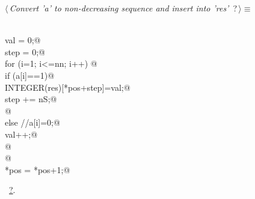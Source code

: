 \documentclass[reqno]{amsart}
\renewcommand{\NWtarget}[2]{\hypertarget{#1}{#2}}
\renewcommand{\NWlink}[2]{\hyperlink{#1}{#2}}
\begin{document}
\begin{flushleft} \small
\begin{minipage}{\linewidth}\label{scrap13}\raggedright\small
\NWtarget{nuweb?}{} $\langle\,${\itshape Convert 'a' to non-decreasing sequence and insert into 'res'}\nobreak\ {\footnotesize {?}}$\,\rangle\equiv$
\vspace{-1ex}
\begin{list}{}{} \item
\mbox{}\verb@@\\
\mbox{}\verb@                val = 0;@\\
\mbox{}\verb@                step = 0;@\\
\mbox{}\verb@                for (i=1; i<=nn; i++) {@\\
\mbox{}\verb@                        if (a[i]==1){@\\
\mbox{}\verb@                                INTEGER(res)[*pos+step]=val;@\\
\mbox{}\verb@                                step += nS;@\\
\mbox{}\verb@                        }@\\
\mbox{}\verb@                        else { //a[i]=0;@\\
\mbox{}\verb@                                val++;@\\
\mbox{}\verb@                        }@\\
\mbox{}\verb@                }@\\
\mbox{}\verb@            *pos = *pos+1;@\\
\mbox{}\verb@@{\NWsep}
\end{list}
\vspace{-1.5ex}
\footnotesize
\begin{list}{}{\setlength{\itemsep}{-\parsep}\setlength{\itemindent}{-\leftmargin}}
\item \NWtxtMacroRefIn\ \NWlink{nuweb?}{?}.

\item{}
\end{list}
\end{minipage}\vspace{4ex}
\end{flushleft}
\end{document}
